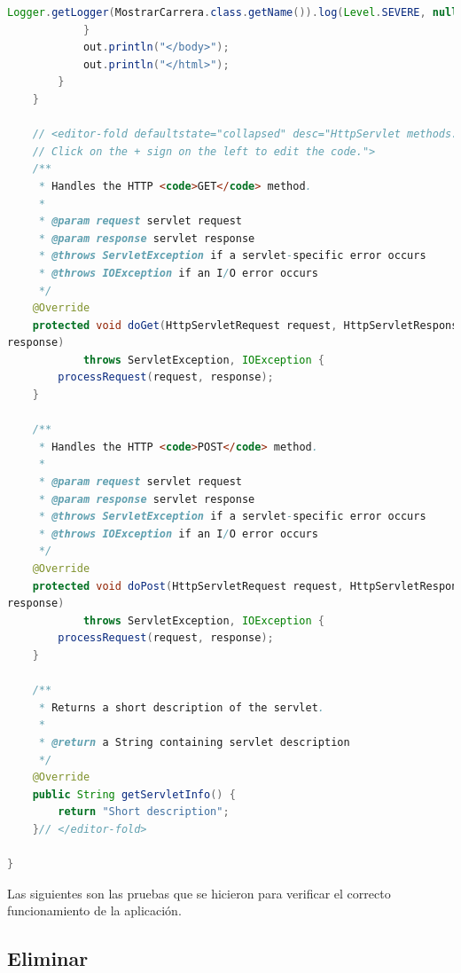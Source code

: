 \documentclass[a4paper,12pt]{article}
\begin{document}
\begin{lstlisting}[language=Java, style=customJava, 
caption={MostrarCarrera.java},captionpos=b,basicstyle=\fontfamily{cmss}\small]
Logger.getLogger(MostrarCarrera.class.getName()).log(Level.SEVERE, null, e);
            }
            out.println("</body>");
            out.println("</html>");
        }
    }

    // <editor-fold defaultstate="collapsed" desc="HttpServlet methods. 
    // Click on the + sign on the left to edit the code.">
    /**
     * Handles the HTTP <code>GET</code> method.
     *
     * @param request servlet request
     * @param response servlet response
     * @throws ServletException if a servlet-specific error occurs
     * @throws IOException if an I/O error occurs
     */
    @Override
    protected void doGet(HttpServletRequest request, HttpServletResponse 
response)
            throws ServletException, IOException {
        processRequest(request, response);
    }

    /**
     * Handles the HTTP <code>POST</code> method.
     *
     * @param request servlet request
     * @param response servlet response
     * @throws ServletException if a servlet-specific error occurs
     * @throws IOException if an I/O error occurs
     */
    @Override
    protected void doPost(HttpServletRequest request, HttpServletResponse 
response)
            throws ServletException, IOException {
        processRequest(request, response);
    }

    /**
     * Returns a short description of the servlet.
     *
     * @return a String containing servlet description
     */
    @Override
    public String getServletInfo() {
        return "Short description";
    }// </editor-fold>

}

\end{lstlisting}

Las siguientes son las pruebas que se hicieron para verificar el correcto 
funcionamiento de la aplicación.

\subsection{Eliminar}
\end{document}
